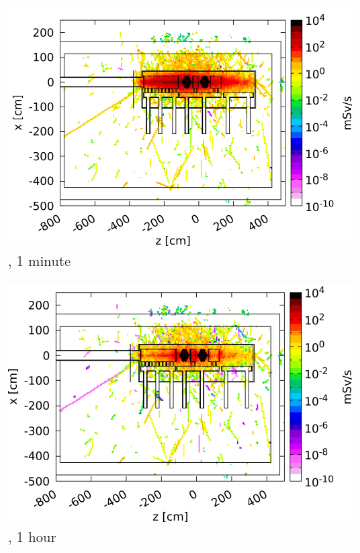 \begin{figure}
     \begin{subfigure}[b]{0.49\textwidth}
   \centering
    \includegraphics[width=\textwidth]{Figures/BeamDump/Design2_1.png}
   \caption{\designtwo, 1 minute}
   \end{subfigure}
   \hfill
    \begin{subfigure}[b]{0.49\textwidth}
   \centering
    \includegraphics[width=\textwidth]{Figures/BeamDump/Design2_2.png}
   \caption{\designtwo, 1 hour}
   \end{subfigure}\\
     \begin{subfigure}[b]{0.49\textwidth}
   \centering

\end{subfigure}
\end{figure}
